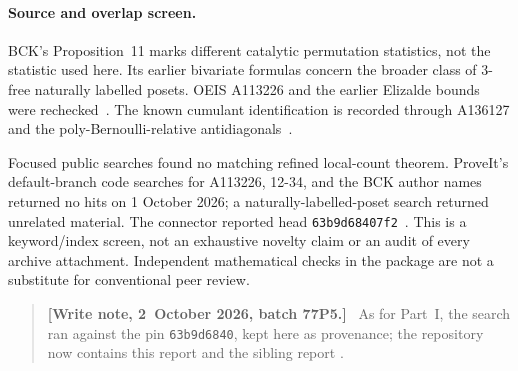 \documentclass[11pt]{article}
\theoremstyle{remark}\newtheorem{remark}[theorem]{Remark}
\newenvironment{writenote}{\begin{quote}\small\raggedright\textbf{[Write note, 2~October 2026, batch 77P5.]}\ }{\end{quote}}
\begin{document}
\paragraph{Source and overlap screen.}
BCK's Proposition~11 marks different catalytic permutation statistics, not the statistic used here. Its earlier bivariate formulas concern the broader class of $3$-free naturally labelled posets. OEIS A113226 and the earlier Elizalde bounds were rechecked~\cite{oeis,elizalde}. The known cumulant identification is recorded through A136127 and the poly-Bernoulli-relative antidiagonals~\cite{oeis136,testart}.

Focused public searches found no matching refined local-count theorem. ProveIt's default-branch code searches for A113226, 12-34, and the BCK author names returned no hits on 1 October 2026; a naturally-labelled-poset search returned unrelated material. The connector reported head \texttt{63b9d68407f2}~\cite{proveit}. This is a keyword/index screen, not an exhaustive novelty claim or an audit of every archive attachment. Independent mathematical checks in the package are not a substitute for conventional peer review.
\begin{writenote}
As for Part~I, the search ran against the pin \texttt{63b9d6840}, kept
here as provenance; the repository now contains this report and the
sibling report .
\end{writenote}
\end{document}
